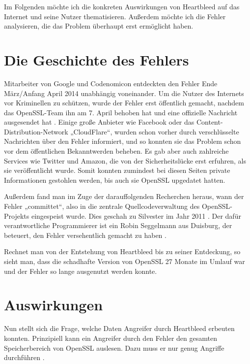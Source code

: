 \documentclass[12pt]{article}
\begin{document}
Im Folgenden möchte ich die konkreten Auswirkungen von Heartbleed auf das Internet und seine Nutzer thematisieren. Außerdem möchte ich die Fehler analysieren, die das Problem überhaupt erst ermöglicht haben. 

\section{Die Geschichte des Fehlers}

Mitarbeiter von Google und Codenomicon entdeckten den Fehler Ende März/Anfang April 2014 unabhängig voneinander. Um die Nutzer des Internets vor Kriminellen zu schützen, wurde der Fehler erst öffentlich gemacht, nachdem das OpenSSL-Team ihn am 7. April behoben hat \citep{grubb_heartbleed_2014} und eine offizielle Nachricht ausgesendet hat \citep{openssl_openssl_2014}. Einige große Anbieter wie Facebook oder das Content-Distribution-Network „CloudFlare“, wurden schon vorher durch verschlüsselte Nachrichten über den Fehler informiert, und so konnten sie das Problem schon vor dem öffentlichen Bekanntwerden beheben. Es gab aber auch zahlreiche Services wie Twitter und Amazon, die von der Sicherheitslücke erst erfuhren, als sie veröffentlicht wurde. Somit konnten zumindest bei diesen Seiten private Informationen gestohlen werden, bis auch sie OpenSSL upgedatet hatten.

Außerdem fand man im Zuge der darauffolgenden Recherchen heraus, wann der Fehler „committet“, also in die zentrale Quellcodeverwaltung des OpenSSL-Projekts eingespeist wurde. Dies geschah zu Silvester im Jahr 2011 \citep{brodkin_heartbleed_2014}. Der dafür verantwortliche Programmierer ist ein Robin Seggelmann aus Duisburg, der beteuert, den Fehler versehentlich gemacht zu haben \citep{schulz_programmierer_2014}.

Rechnet man von der Entstehung von Heartbleed bis zu seiner Entdeckung, so sieht man, dass die schadhafte Version von OpenSSL 27 Monate im Umlauf war und der Fehler so lange ausgenutzt werden konnte. 

\section{Auswirkungen}

Nun stellt sich die Frage, welche Daten Angreifer durch Heartbleed erbeuten konnten. Prinzipiell kann ein Angreifer durch den Fehler den gesamten Speicherbereich von OpenSSL auslesen. Dazu muss er nur genug Angriffe durchführen \citep{codenomicon_heartbleed_2014}.
\end{document}
